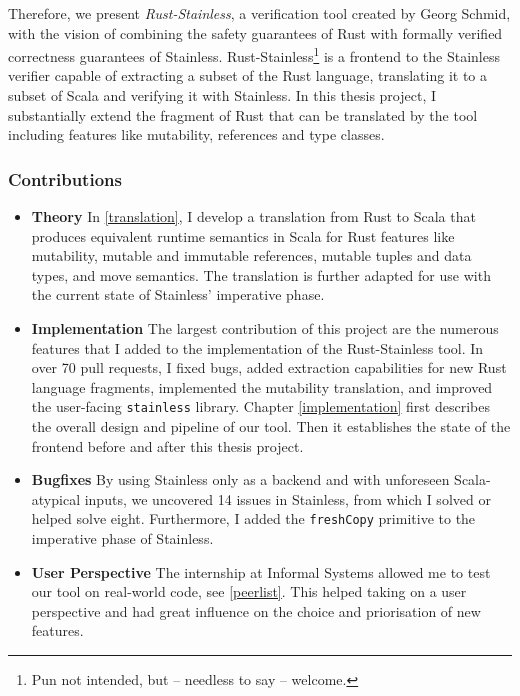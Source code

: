 Therefore, we present \emph{Rust-Stainless}, a verification tool created by
Georg Schmid, with the vision of combining the safety guarantees of Rust with
formally verified correctness guarantees of Stainless.
Rust-Stainless\footnote{Pun not intended, but -- needless to say -- welcome.} is
a frontend to the Stainless verifier capable of extracting a subset of the Rust
language, translating it to a subset of Scala and verifying it with Stainless.
In this thesis project, I substantially extend the fragment of Rust that can be
translated by the tool including features like mutability, references and type
classes.

\subsubsection{Contributions}

\begin{itemize}

\item \textbf{Theory} In \autoref{translation}, I develop a translation from
Rust to Scala that produces equivalent runtime semantics in Scala for Rust
features like mutability, mutable and immutable references, mutable tuples and
data types, and move semantics. The translation is further adapted for use with
the current state of Stainless' imperative phase.

\item \textbf{Implementation} The largest contribution of this project are the
numerous features that I added  to the implementation of the Rust-Stainless
tool. In over 70 pull requests, I fixed bugs, added extraction capabilities for
new Rust language fragments, implemented the mutability translation, and
improved the user-facing \lstinline!stainless! library. Chapter
\ref{implementation} first describes the overall design and pipeline of our
tool. Then it establishes the state of the frontend before and after this thesis
project.

\item \textbf{Bugfixes} By using Stainless only as a backend and with unforeseen
Scala-atypical inputs, we uncovered 14 issues in Stainless, from which I solved
or helped solve eight. Furthermore, I added the \lstinline!freshCopy! primitive
to the imperative phase of Stainless.

\item \textbf{User Perspective} The internship at Informal Systems allowed me to
test our tool on real-world code, see \autoref{peerlist}. This helped taking on
a user perspective and had great influence on the choice and priorisation of new
features.

\end{itemize}
